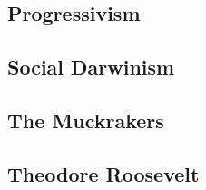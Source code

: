 \documentclass{article}
\begin{document}
\subsection{ Progressivism}

\subsection{ Social Darwinism}

\subsection{ The Muckrakers}

\subsection{ Theodore Roosevelt}
\end{document}
